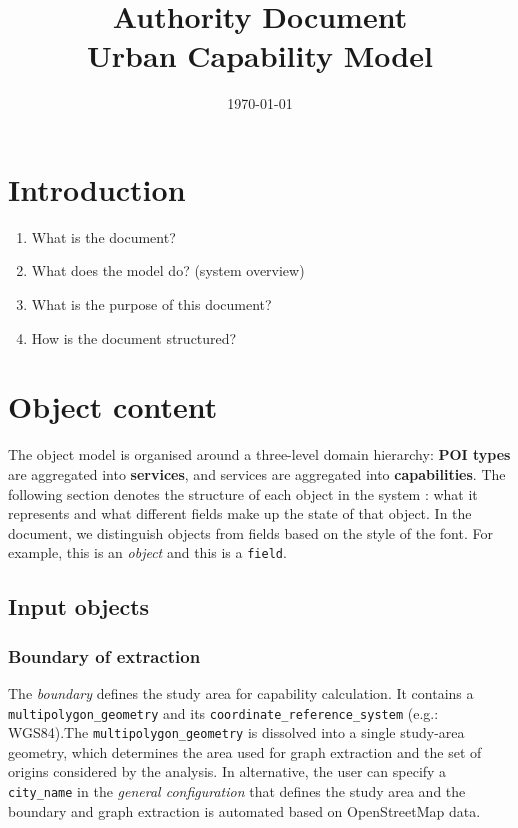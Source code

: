 \documentclass{article}
\title{Authority Document \\Urban Capability Model}
\date{\today}
\begin{document}
\maketitle

\section{Introduction}

\begin{enumerate}
    \item What is the document?
    \item What does the model do? (system overview)
    \item What is the purpose of this document?
    \item How is the document structured?
\end{enumerate}

\section{Object content}
The object model is organised around a three-level domain hierarchy: \textbf{POI types} are aggregated into \textbf{services}, and services are aggregated into \textbf{capabilities}. The following section denotes the structure of each object in the system : what it represents and what different fields make up the state of that object. In the document, we distinguish objects from fields based on the style of the font. For example, this is an \emph{object} and this is a \texttt{field}.
\subsection{Input objects}
\subsubsection*{Boundary of extraction}
    The \emph{boundary} defines the study area for capability calculation. It contains a \texttt{multipolygon\_geometry} and its \texttt{coordinate\_reference\_system} (e.g.: WGS84).The \texttt{multipolygon\_geometry} is dissolved into a single study-area geometry, which determines the area used for graph extraction and the set of origins considered by the analysis. In alternative, the user can specify a \texttt{city\_name} in the \emph{general configuration} that defines the study area and the boundary and graph extraction is automated based on OpenStreetMap data.
\end{document}
